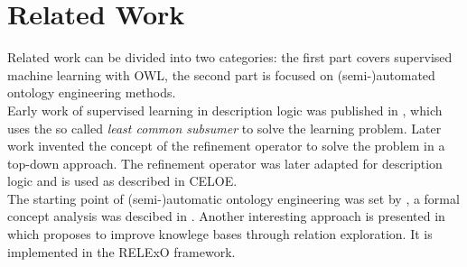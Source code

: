\section{Related Work}
Related work can be divided into two categories: the first part covers
supervised machine learning with OWL, the second part is focused on
(semi-)automated ontology engineering methods.
\\
Early work of supervised learning in description logic was published in
\cite{related_9,related_10}, which uses the so called \emph{least common
subsumer} to solve the learning problem. Later work invented the concept of the
refinement operator to solve the problem in a top-down
approach.\cite{related_7} The refinement operator was later adapted for
description logic \cite{refinement1,refinement2,refinement3} and is used as described in
CELOE.
\\
The starting point of (semi-)automatic ontology engineering was set by
\cite{rleated_31}, a formal concept analysis was descibed in \cite{related_5}.
Another interesting approach is presented in \cite{related_relexo} which
proposes to improve knowlege bases through relation exploration. It is
implemented in the RELExO framework.